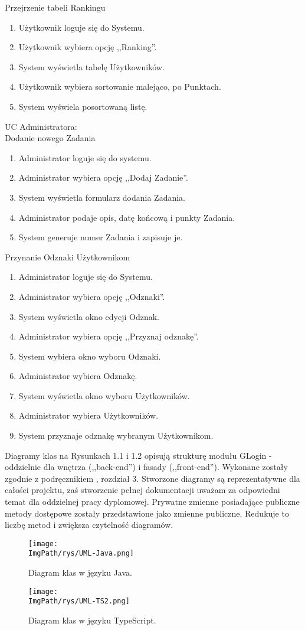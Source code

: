 \documentclass[a4paper,12pt,twoside,openany]{report}
\newcommand{\ImgPath}{.}
\begin{document}
	Przejrzenie tabeli Rankingu
	\begin{enumerate}
		\item Użytkownik loguje się do Systemu.
		\item Użytkownik wybiera opcję ,,Ranking''.
		\item System wyświetla tabelę Użytkowników.
		\item Użytkownik wybiera sortowanie malejąco, po Punktach.
		\item System wyświela posortowaną listę.
	\end{enumerate}
	UC Administratora:\\
	Dodanie nowego Zadania
	\begin{enumerate}
		\item Administrator loguje się do systemu.
		\item Administrator wybiera opcję ,,Dodaj Zadanie''.
		\item System wyświetla formularz dodania Zadania.
		\item Administrator podaje opis, datę końcową i punkty Zadania.
		\item System generuje numer Zadania i zapisuje je.
	\end{enumerate}
	Przynanie Odznaki Użytkownikom
	\begin{enumerate}
		\item Administrator loguje się do Systemu.
		\item Administrator wybiera opcję ,,Odznaki''.
		\item System wyświetla okno edycji Odznak.
		\item Administrator wybiera opcję ,,Przyznaj odznakę''.
		\item System wybiera okno wyboru Odznaki.
		\item Administrator wybiera Odznakę.
		\item System wyświetla okno wyboru Użytkowników.
		\item Administrator wybiera Użytkowników.
		\item System przyznaje odznakę wybranym Użytkownikom.
	\end{enumerate}
	Diagramy klas na Rysunkach 1.1 i 1.2 opisują strukturę modułu GLogin - oddzielnie dla wnętrza (,,back-end'') i fasady (,,front-end''). Wykonane zostały zgodnie z podręcznikiem \cite{Smialek}, rozdział 3. Stworzone diagramy są reprezentatywne dla całości projektu, zaś stworzenie pełnej dokumentacji uważam za odpowiedni temat dla oddzielnej pracy dyplomowej. Prywatne zmienne posiadające publiczne metody dostępowe zostały przedstawione jako zmienne publiczne. Redukuje to liczbę metod i zwiększa czytelność diagramów.
	\begin{sidewaysfigure}[!htbp]

			\texttt{[image: \\ImgPath/rys/UML-Java.png]}

		\caption{Diagram klas w języku Java.}
		\label{UMLJava}
	\end{sidewaysfigure}
		\begin{sidewaysfigure}[!htbp]

				\texttt{[image: \\ImgPath/rys/UML-TS2.png]}

			\caption{Diagram klas w języku TypeScript.}
			\label{UMLTS}
		\end{sidewaysfigure}
\end{document}

